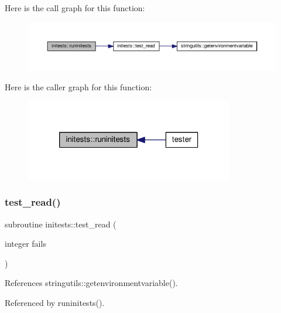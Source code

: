 Here is the call graph for this function\+:
\nopagebreak
\begin{figure}[H]
\begin{center}
\leavevmode
\includegraphics[width=350pt]{namespaceinitests_ae612a57e2f1fcb5a2f8001fcb5259c62_cgraph}
\end{center}
\end{figure}
Here is the caller graph for this function\+:
\nopagebreak
\begin{figure}[H]
\begin{center}
\leavevmode
\includegraphics[width=258pt]{namespaceinitests_ae612a57e2f1fcb5a2f8001fcb5259c62_icgraph}
\end{center}
\end{figure}
\mbox{\label{namespaceinitests_a0b26dd9f51d814267992b7a0b9bac310}} 
\subsubsection{\texorpdfstring{test\+\_\+read()}{test\_read()}}
{\footnotesize\ttfamily subroutine initests\+::test\+\_\+read (\begin{DoxyParamCaption}\item[{integer}]{fails }\end{DoxyParamCaption})}



References stringutils\+::getenvironmentvariable().



Referenced by runinitests().

